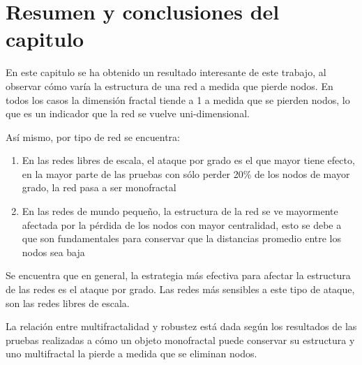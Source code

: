 \newpage
\section{Resumen y conclusiones del capitulo}

En este capitulo se ha obtenido un resultado interesante de este trabajo, al observar cómo varía la estructura de una red a medida que pierde nodos. En todos los casos la dimensión fractal tiende a 1 a medida que se pierden nodos, lo que es un indicador que la red se vuelve uni-dimensional.

Así mismo, por tipo de red se encuentra:

\begin{enumerate}
    \item En las redes libres de escala, el ataque por grado es el que mayor tiene efecto, en la mayor parte de las pruebas con sólo perder 20\% de los nodos de mayor grado, la red pasa a ser monofractal
    \item En las redes de mundo pequeño, la estructura de la red se ve mayormente afectada por la pérdida de los nodos con mayor centralidad, esto se debe a que son fundamentales para conservar que la distancias promedio entre los nodos sea baja
\end{enumerate}

Se encuentra que en general, la estrategia más efectiva para afectar la estructura de las redes es el ataque por grado. Las redes más sensibles a este tipo de ataque, son las redes libres de escala.

La relación entre multifractalidad y robustez está dada según los resultados de las pruebas realizadas a cómo un objeto monofractal puede conservar su estructura y uno multifractal la pierde a medida que se eliminan nodos.
